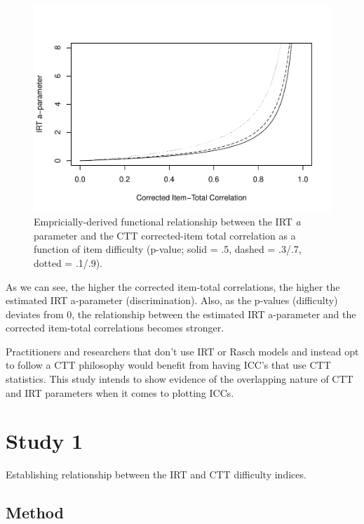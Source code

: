 \documentclass[
  man]{apa6}
\begin{document}
\begin{figure}
\centering
\includegraphics{SIOP_files/figure-latex/acorrected-1.pdf}
\caption{\label{fig:acorrected}Empricially-derived functional relationship between the IRT \emph{a} parameter and the CTT corrected-item total correlation as a function of item difficulty (p-value; solid = .5, dashed = .3/.7, dotted = .1/.9).}
\end{figure}

As we can see, the higher the corrected item-total correlations, the higher the estimated IRT a-parameter (discrimination). Also, as the p-values (difficulty) deviates from 0, the relationship between the estimated IRT a-parameter and the corrected item-total correlations becomes stronger.

Practitioners and researchers that don't use IRT or Rasch models and instead opt to follow a CTT philosophy would benefit from having ICC's that use CTT statistics. This study intends to show evidence of the overlapping nature of CTT and IRT parameters when it comes to plotting ICCs.

\hypertarget{study-1}{%
\section{Study 1}\label{study-1}}

Establishing relationship between the IRT and CTT difficulty indices.

\hypertarget{method}{%
\subsection{Method}\label{method}}
\end{document}
